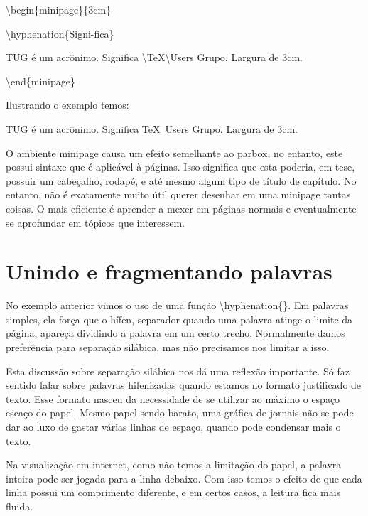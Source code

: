\textbackslash begin\{minipage\}\{3cm\}

\textbackslash hyphenation\{Signi-fica\}

TUG é um acrônimo. Significa \textbackslash TeX\textbackslash Users Grupo. Largura de 3cm.

\textbackslash end\{minipage\}

\vspace{0.3cm}
Ilustrando o exemplo temos:
\vspace{0.3cm}

\begin{minipage}{3cm}
TUG é um acrônimo. Significa \TeX\ Users Grupo. Largura de 3cm.
\end{minipage}

\vspace{0.3cm}

O ambiente minipage causa um efeito semelhante ao parbox, no entanto, este possui sintaxe que é aplicável à páginas.
Isso significa que esta poderia, em tese, possuir um cabeçalho, rodapé, e até mesmo algum tipo de título de capítulo.
No entanto, não é exatamente muito útil querer desenhar em uma minipage tantas coisas.
O mais eficiente é aprender a mexer em páginas normais e eventualmente se aprofundar em tópicos que interessem.

\section{Unindo e fragmentando palavras}
No exemplo anterior vimos o uso de uma função \textbackslash hyphenation\{\}.
Em palavras simples, ela força que o hífen, separador quando uma palavra atinge o limite da página,
apareça dividindo a palavra em um certo trecho.
Normalmente damos preferência para separação silábica, mas não precisamos nos limitar a isso.

Esta discussão sobre separação silábica nos dá uma reflexão importante.
Só faz sentido falar sobre palavras hifenizadas quando estamos no formato justificado de texto.
Esse formato nasceu da necessidade de se utilizar ao máximo o espaço escaço do papel.
Mesmo papel sendo barato, uma gráfica de jornais não se pode dar ao luxo de gastar várias linhas de espaço,
quando pode condensar mais o texto.

Na visualização em internet, como não temos a limitação do papel, a palavra inteira pode ser jogada para a linha debaixo.
Com isso temos o efeito de que cada linha possui um comprimento diferente, e em certos casos, a leitura fica mais fluida.

